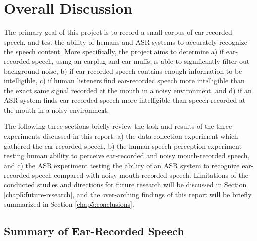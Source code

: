 % 
% 
% 

\chapter{Overall Discussion\label{chapter5}}


The primary goal of this project is to record a small corpus of ear-recorded speech, and test the ability of humans and ASR systems to accurately recognize the speech content.  More specifically, the project aims to determine a) if ear-recorded speech, using an earplug and ear muffs, is able to significantly filter out background noise, b) if ear-recorded speech contains enough information to be intelligible, c) if human listeners find ear-recorded speech more intelligible than the exact same signal recorded at the mouth in a noisy environment, and d) if an ASR system finds ear-recorded speech more intelligible than speech recorded at the mouth in a noisy environment.

The following three sections briefly review the task and results of the three experiments discussed in this report: a) the data collection experiment which gathered the ear-recorded speech, b) the human speech perception experiment testing human ability to perceive ear-recorded and noisy mouth-recorded speech, and c) the ASR experiment testing the ability of an ASR system to recognize ear-recorded speech compared with noisy mouth-recorded speech.  Limitations of the conducted studies and directions for future research will be discussed in Section \ref{chap5:future-research}, and the over-arching findings of this report will be briefly summarized in Section \ref{chap5:conclusions}.


\section{Summary of Ear-Recorded Speech}\label{sec:chap2-review}

